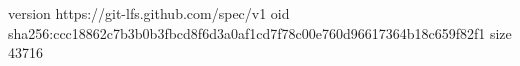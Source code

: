 version https://git-lfs.github.com/spec/v1
oid sha256:ccc18862c7b3b0b3fbcd8f6d3a0af1cd7f78c00e760d96617364b18c659f82f1
size 43716
